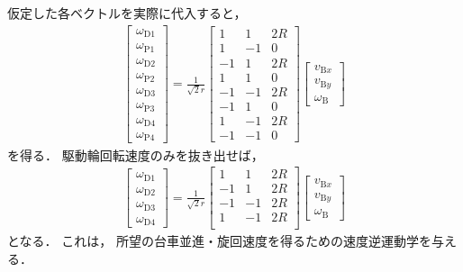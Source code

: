 ﻿\documentclass[a4paper]{jsarticle}
\begin{document}
仮定した各ベクトルを実際に代入すると，
\begin{align*}
\begin{bmatrix}
 \omega_{\mathrm{D}1} \\ \omega_{\mathrm{P}1} \\
 \omega_{\mathrm{D}2} \\ \omega_{\mathrm{P}2} \\
 \omega_{\mathrm{D}3} \\ \omega_{\mathrm{P}3} \\
 \omega_{\mathrm{D}4} \\ \omega_{\mathrm{P}4}
\end{bmatrix}
=
\frac{1}{\sqrt{2}r}
\begin{bmatrix}
 1 &  1 & 2R \\
 1 & -1 &  0 \\
-1 &  1 & 2R \\
 1 &  1 &  0 \\
-1 & -1 & 2R \\
-1 &  1 &  0 \\
 1 & -1 & 2R \\
-1 & -1 &  0
\end{bmatrix}
\begin{bmatrix}
 v_{\mathrm{B}x} \\ v_{\mathrm{B}y} \\ \omega_{\mathrm{B}}
\end{bmatrix}
\end{align*}
を得る．
駆動輪回転速度のみを抜き出せば，
\begin{align*}
\begin{bmatrix}
 \omega_{\mathrm{D}1} \\
 \omega_{\mathrm{D}2} \\
 \omega_{\mathrm{D}3} \\
 \omega_{\mathrm{D}4}
\end{bmatrix}
=
\frac{1}{\sqrt{2}r}
\begin{bmatrix}
 1 &  1 & 2R \\
-1 &  1 & 2R \\
-1 & -1 & 2R \\
 1 & -1 & 2R \\
\end{bmatrix}
\begin{bmatrix}
 v_{\mathrm{B}x} \\ v_{\mathrm{B}y} \\ \omega_{\mathrm{B}}
\end{bmatrix}
\end{align*}
となる．
これは，
所望の台車並進・旋回速度を得るための速度逆運動学を与える．
\end{document}
